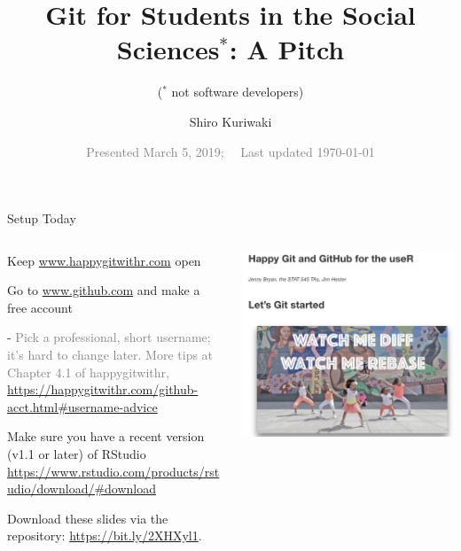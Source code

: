 \documentclass[ignorenonframetext, 10pt, aspectratio=169]{beamer}
\title{\textbf{\Large{Git for Students in the Social Sciences$^*$: A Pitch}}}
\subtitle{($^*$ not software developers)}
\author{Shiro Kuriwaki}
\date{\small \textcolor{gray}{Presented March 5, 2019;~~ Last updated \today}}
\begin{document}
\begin{frame}{Setup Today}
\begin{columns}[T]
\begin{column}{0.6\textwidth}
\begin{wideenumerate}
\item Keep  \url{www.happygitwithr.com} open
\item Go to \url{www.github.com} and make a free account
\begin{wideitemize}
\item[-] \textcolor{gray}{\footnotesize Pick a professional, short username; it's hard to change later. More tips at Chapter 4.1 of happygitwithr,  \url{https://happygitwithr.com/github-acct.html\#username-advice}}
\end{wideitemize}
\item Make sure you have a recent version (v1.1 or later) of RStudio \url{https://www.rstudio.com/products/rstudio/download/\#download}
\item Download these slides via the repository: \url{https://bit.ly/2XHXyl1}.
\end{wideenumerate}
\end{column}
\begin{column}{0.4\textwidth}
\includegraphics[width = \linewidth]{happygit.png}
\end{column}
\end{columns}
\end{frame}
\end{document}
